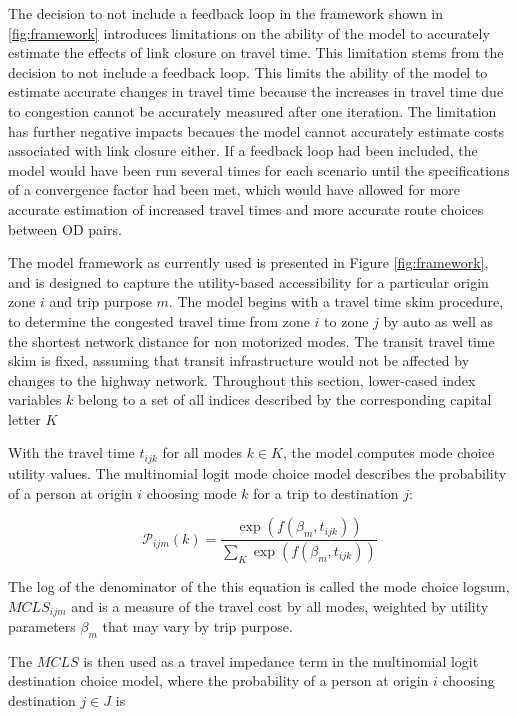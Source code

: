 The decision to not include a feedback loop in the framework shown in \ref{fig:framework} introduces limitations on the ability of the model to accurately estimate the effects of link closure on travel time. This limitation stems from the decision to not include a feedback loop. This limits the ability of the model to estimate accurate changes in travel time because the increases in travel time due to congestion cannot be accurately measured after one iteration. The limitation has further negative impacts becaues the model cannot accurately estimate costs associated with link closure either.
If a feedback loop had been included, the model would have been run several times for each scenario until the specifications of a convergence factor had been met, which would have allowed for more accurate estimation of increased travel times and more accurate route choices between OD pairs.

The model framework as currently used is presented in Figure \ref{fig:framework}, and is designed to capture the utility-based accessibility for a particular origin zone \(i\) and trip purpose \(m\). The model begins with a travel time skim procedure, to determine the congested travel time from zone \(i\) to zone \(j\) by auto as well as the shortest network distance for non motorized modes. The transit travel time skim is fixed, assuming that transit infrastructure would not be affected by changes to the highway network. Throughout this section, lower-cased index variables \(k\) belong to a set of all indices described by the corresponding capital letter \(K\)

With the travel time \(t_{ijk}\) for all modes \(k \in K\), the model computes mode choice utility values. The multinomial logit mode choice model describes the probability of a person at origin \(i\) choosing mode \(k\) for a trip to destination \(j\):

\begin{equation}
\mathcal{P}_{ijm}(k) = \frac{\exp(f(\beta_{m},
t_{ijk}))}{\sum_{K}\exp(f(\beta_{m}, t_{ijk}))}
  \label{eq:mcp}
\end{equation}

The log of the denominator of the this equation is called the
mode choice logsum, \(MCLS_{ijm}\) and is a measure of the travel cost by
all modes, weighted by utility parameters \(\beta_m\) that may vary by
trip purpose.

The \(MCLS\) is then used as a travel impedance term in the multinomial
logit
destination choice model, where the probability of a person at origin \(i\)
choosing destination \(j \in J\) is

